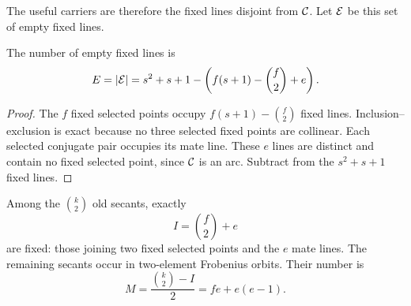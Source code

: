 The useful carriers are therefore the fixed lines disjoint from $\mathcal{C}$.
Let $\mathcal{E}$ be this set of empty fixed lines.

\begin{lemma}\label{lem:empty-lines}
The number of empty fixed lines is
\begin{equation}\label{eq:E}
 E=|\mathcal{E}|=s^2+s+1-\left(f(s+1)-\binom f2+e\right).
\end{equation}
\end{lemma}

\begin{proof}
The $f$ fixed selected points occupy
$f(s+1)-\binom f2$ fixed lines.  Inclusion--exclusion is exact because no
three selected fixed points are collinear.  Each selected conjugate pair
occupies its mate line.  These $e$ lines are distinct and contain no fixed
selected point, since $\mathcal{C}$ is an arc.  Subtract from the $s^2+s+1$ fixed
lines.
\end{proof}

Among the $\binom k2$ old secants, exactly
\[
 I=\binom f2+e
\]
are fixed: those joining two fixed selected points and the $e$ mate lines.
The remaining secants occur in two-element Frobenius orbits.  Their number
is
\begin{equation}\label{eq:M}
 M=\frac{\binom k2-I}{2}=fe+e(e-1).
\end{equation}
